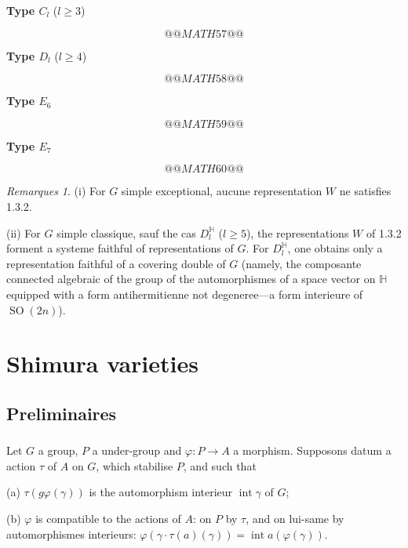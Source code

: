 \documentclass[12pt,a4paper]{article}
\theoremstyle{plain}
\theoremstyle{definition}
\theoremstyle{remark}
\newtheorem{remarks}[theorem]{Remarques}
\DeclareMathOperator{\Int}{int}
\DeclareMathOperator{\SO}{SO}
\begin{document}
\begin{center}
\textbf{Type $C_l$} ($l \ge 3$)
\end{center}
\[
@@MATH57@@
\]

\begin{center}
\textbf{Type $D_l$} ($l \ge 4$)
\end{center}
\[
@@MATH58@@
\]

\begin{center}
\textbf{Type $E_6$}
\end{center}
\[
@@MATH59@@
\]

\begin{center}
\textbf{Type $E_7$}
\end{center}
\[
@@MATH60@@
\]

\begin{remarks}
(i) For $G$ simple exceptional, aucune representation $W$ ne satisfies 1.3.2.

(ii) For $G$ simple classique, sauf the cas $D_l^{\mathbb{H}}$ ($l \ge 5$), the representations $W$ of 1.3.2 forment a systeme faithful of representations of $G$. For $D_l^{\mathbb{H}}$, one obtains only a representation faithful of a covering double of $G$ (namely, the composante connected algebraic of the group of the automorphismes of a space vector on $\mathbb{H}$ equipped with a form antihermitienne not degeneree---a form interieure of $\SO(2n)$).
\end{remarks}

\section{Shimura varieties}

\subsection{Preliminaires}

\subsubsection{}

Let $G$ a group, $P$ a under-group and $\varphi:P \to A$ a morphism. Supposons datum a action $\tau$ of $A$ on $G$, which stabilise $P$, and such that

(a) $\tau(g\varphi(\gamma))$ is the automorphism interieur $\Int \gamma$ of $G$;

(b) $\varphi$ is compatible to the actions of $A$: on $P$ by $\tau$, and on lui-same by automorphismes interieurs: $\varphi(\gamma \cdot \tau(a)(\gamma)) = \Int a(\varphi(\gamma))$.
\end{document}
